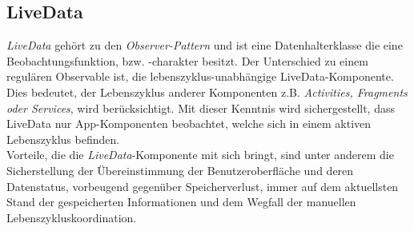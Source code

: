 \subsection*{LiveData}
\label{sec:LiveData}
\textit{LiveData} gehört zu den \textit{Observer-Pattern} und ist eine Datenhalterklasse die eine Beobachtungsfunktion, bzw. -charakter besitzt. Der 
Unterschied zu einem regulären Observable ist, die lebenszyklus-unabhängige LiveData-Komponente. Dies bedeutet, der Lebenszyklus anderer 
Komponenten z.B. \textit{Activities, Fragments oder Services}, wird berücksichtigt. Mit dieser Kenntnis wird sichergestellt, dass LiveData 
nur App-Komponenten beobachtet, welche sich in einem aktiven Lebenszyklus befinden. \cite{liveData}
\\ 
\linebreak
Vorteile, die die \textit{LiveData}-Komponente mit sich bringt, sind unter anderem die Sicherstellung der Übereinstimmung der Benutzeroberfläche und 
deren Datenstatus, vorbeugend gegenüber Speicherverlust, immer auf dem aktuellsten Stand der gespeicherten Informationen und dem Wegfall 
der manuellen Lebenszykluskoordination. \cite{livedata.2020}
